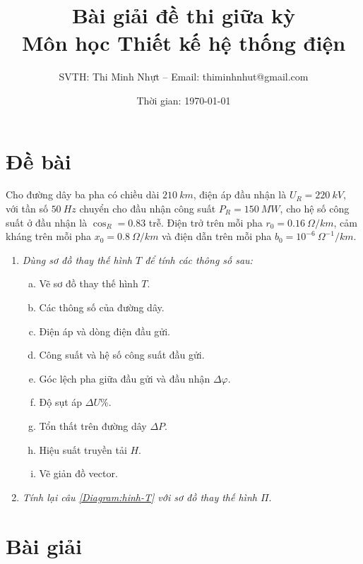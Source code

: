 \documentclass[12pt,a4paper]{article}
\title{\textbf{Bài giải đề thi giữa kỳ\vspace{.4cm}\\Môn học Thiết kế hệ thống điện}}
\author{SVTH: Thi Minh Nhựt -- Email: thiminhnhut@gmail.com}
\date{Thời gian: \today}
\newcommand{\unit}[1]{~#1}
\begin{document}
\maketitle

\tableofcontents

\section{Đề bài}
	Cho đường dây ba pha có chiều dài $210 \unit{km}$, điện áp đầu nhận là $U_R = 220 \unit{kV}$, với tần số $50 \unit{Hz}$ chuyển cho đầu nhận công suất $P_R = 150 \unit{MW}$, cho hệ số công suất ở đầu nhận là $\cos_R = 0.83$ trễ. Điện trở trên mỗi pha $r_0 = 0.16 \unit{\Omega/km}$, cảm kháng trên mỗi pha $x_0 = 0.8 \unit{\Omega/km}$ và điện dẫn trên mỗi pha $b_0 = 10^{-6} \unit{\Omega^{-1}/km}$.

	\begin{enumerate}[\it 1.]
		\item \textit{Dùng sơ đồ thay thế hình $T$ để tính các thông số sau:}\label{Diagram:hinh-T}
			\begin{enumerate}[a.]
				\item Vẽ sơ đồ thay thế hình $T$.
				\item Các thông số của đường dây.
				\item Điện áp và dòng điện đầu gửi.
				\item Công suất và hệ số công suất đầu gửi.
				\item Góc lệch pha giữa đầu gửi và đầu nhận $\Delta \varphi$.
				\item Độ sụt áp $\Delta U\%$.
				\item Tổn thất trên đường dây $\Delta P$.
				\item Hiệu suất truyền tải $H$.
				\item Vẽ giản đồ vector.
			\end{enumerate}

		\item \textit{Tính lại câu \ref{Diagram:hinh-T} với sơ đồ thay thế hình $\Pi$}.
\end{enumerate}


\section{Bài giải}
\end{document}
